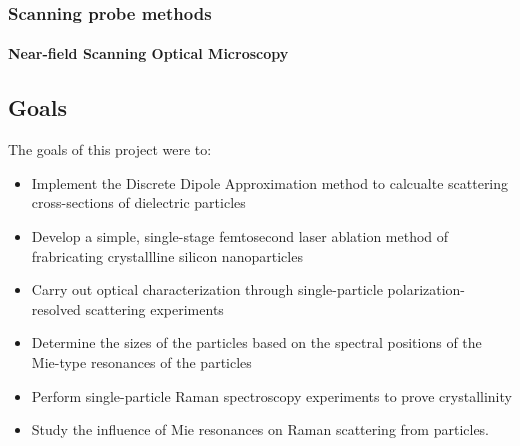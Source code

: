         \subsubsection{Scanning probe methods}
            \paragraph{Near-field Scanning Optical Microscopy}


    \subsection{Goals}
            The goals of this project were to:
            \begin{itemize}
                \item Implement the Discrete Dipole Approximation method to calcualte scattering cross-sections of dielectric particles
                \item Develop a simple, single-stage femtosecond laser ablation method of frabricating crystallline silicon nanoparticles
                \item Carry out optical characterization through single-particle polarization-resolved scattering experiments
                \item Determine the sizes of the particles based on the spectral positions of the Mie-type resonances of the particles
                \item Perform single-particle Raman spectroscopy experiments to prove crystallinity
                \item Study the  influence of Mie resonances on Raman scattering from particles.
            \end{itemize}
